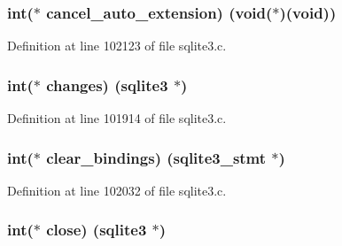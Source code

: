 \subsubsection[{cancel\+\_\+auto\+\_\+extension}]{\setlength{\rightskip}{0pt plus 5cm}int($\ast$ cancel\+\_\+auto\+\_\+extension) (void($\ast$)(void))}\label{structsqlite3__api__routines_a6acef5f8196481f86b71c60619468d23}


Definition at line 102123 of file sqlite3.\+c.

\hypertarget{structsqlite3__api__routines_afa73164142c6aaa87d16b3afacf0900a}{}
\subsubsection[{changes}]{\setlength{\rightskip}{0pt plus 5cm}int($\ast$ changes) ({\bf sqlite3} $\ast$)}\label{structsqlite3__api__routines_afa73164142c6aaa87d16b3afacf0900a}


Definition at line 101914 of file sqlite3.\+c.

\hypertarget{structsqlite3__api__routines_a01a8faefed89a0869f1b816d0ff68a26}{}
\subsubsection[{clear\+\_\+bindings}]{\setlength{\rightskip}{0pt plus 5cm}int($\ast$ clear\+\_\+bindings) ({\bf sqlite3\+\_\+stmt} $\ast$)}\label{structsqlite3__api__routines_a01a8faefed89a0869f1b816d0ff68a26}


Definition at line 102032 of file sqlite3.\+c.

\hypertarget{structsqlite3__api__routines_ab3156009cfdafa2aa5985cd47515132b}{}
\subsubsection[{close}]{\setlength{\rightskip}{0pt plus 5cm}int($\ast$ close) ({\bf sqlite3} $\ast$)}\label{structsqlite3__api__routines_ab3156009cfdafa2aa5985cd47515132b}


